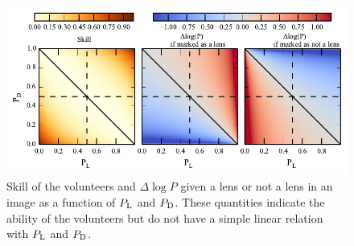 \documentclass[useAMS,usenatbib,a4paper]{mn2e}
\begin{document}
\begin{figure}
\begin{center}
\includegraphics[scale=1.0]{dlnp_skill.pdf}
\caption{ \label{fig:skilldlnp}
Skill of the volunteers and $\Delta\log{P}$ given a lens or not a lens in
an image as a function of $P_{\rm L}$ and $P_{\rm D}$. These
quantities indicate the ability of the volunteers but do not have a simple
linear relation with $P_{\rm L}$ and $P_{\rm D}$.
}
\end{center}
\end{figure}







\label{lastpage}
\bsp
\end{document}
